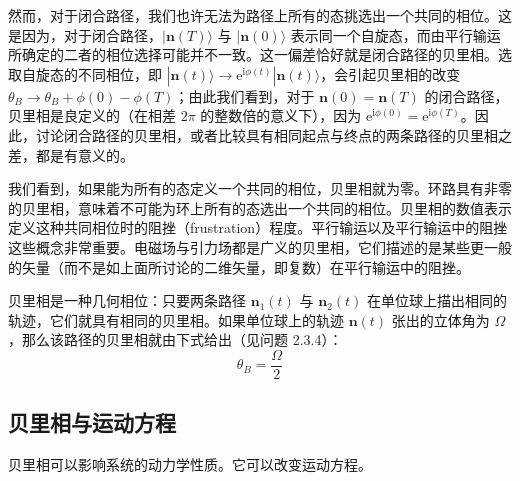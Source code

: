 然而，对于闭合路径，我们也许无法为路径上所有的态挑选出一个共同的相位。这是因为，对于闭合路径，$|\pmb{n}(T)\rangle$ 与 $|\pmb{n}(0)\rangle$ 表示同一个自旋态，而由平行输运所确定的二者的相位选择可能并不一致。这一偏差恰好就是闭合路径的贝里相。选取自旋态的不同相位，即 $|\pmb{n}(t)\rangle \to \mathrm{e}^{\mathrm{i}\phi(t)}|\pmb{n}(t)\rangle$，会引起贝里相的改变 $\theta_B \to \theta_B + \phi(0) - \phi(T)$；由此我们看到，对于 $\pmb{n}(0) = \pmb{n}(T)$ 的闭合路径，贝里相是良定义的（在相差 $2\pi$ 的整数倍的意义下），因为 $\mathrm{e}^{\mathrm{i}\phi(0)} = \mathrm{e}^{\mathrm{i}\phi(T)}$。因此，讨论闭合路径的贝里相，或者比较具有相同起点与终点的两条路径的贝里相之差，都是有意义的。

我们看到，如果能为所有的态定义一个共同的相位，贝里相就为零。环路具有非零的贝里相，意味着不可能为环上所有的态选出一个共同的相位。贝里相的数值表示定义这种共同相位时的阻挫（frustration）程度。平行输运以及平行输运中的阻挫这些概念非常重要。电磁场与引力场都是广义的贝里相，它们描述的是某些更一般的矢量（而不是如上面所讨论的二维矢量，即复数）在平行输运中的阻挫。

贝里相是一种几何相位：只要两条路径 $\pmb{n}_1(t)$ 与 $\pmb{n}_2(t)$ 在单位球上描出相同的轨迹，它们就具有相同的贝里相。如果单位球上的轨迹 $\pmb{n}(t)$ 张出的立体角为 $\Omega$，那么该路径的贝里相就由下式给出（见问题 2.3.4）：
\begin{equation*}
\theta_B = \frac{\Omega}{2}\tag{2.3.5}
\end{equation*}

\subsection{贝里相与运动方程}

\begin{keypoints}
\item 贝里相可以影响系统的动力学性质。它可以改变运动方程。
\end{keypoints}

